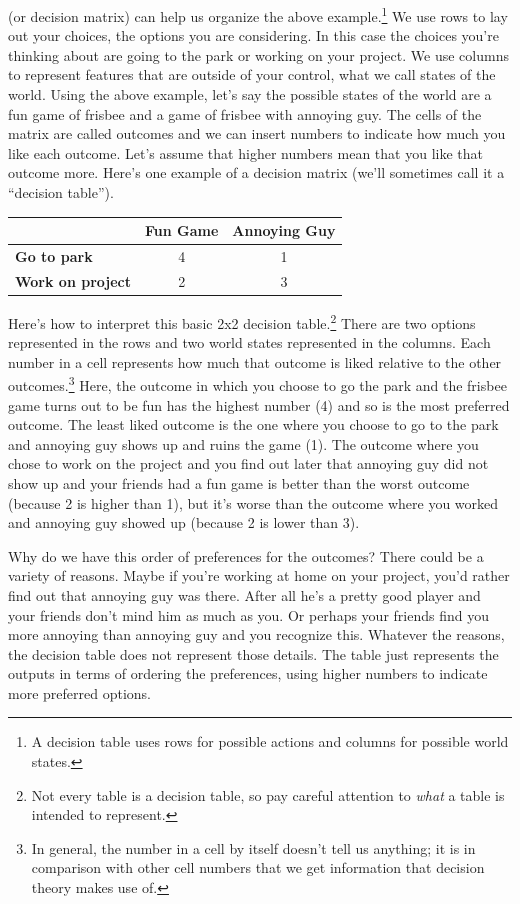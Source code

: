 \documentclass[]{tufte-book}
\begin{document}
 (or decision matrix) can help us organize the above example.\footnote{A decision table uses rows for possible actions and columns for possible world states.} We use rows to lay out your choices, the options you are considering. In this case the choices you're thinking about are going to the park or working on your project. We use columns to represent features that are outside of your control, what we call states of the world. Using the above example, let's say the possible states of the world are a fun game of frisbee and a game of frisbee with annoying guy. The cells of the matrix are called outcomes and we can insert numbers to indicate how much you like each outcome. Let's assume that higher numbers mean that you like that outcome more. Here's one example of a decision matrix (we'll sometimes call it a ``decision table'').

\begin{longtable}[]{@{}lcc@{}}
\toprule
& Fun Game & Annoying Guy\tabularnewline
\midrule
\endhead
\textbf{Go to park} & 4 & 1\tabularnewline
\textbf{Work on project} & 2 & 3\tabularnewline
\bottomrule
\end{longtable}

Here's how to interpret this basic 2x2 decision table.\footnote{Not every table is a decision table, so pay careful attention to \emph{what} a table is intended to represent.} There are two options represented in the rows and two world states represented in the columns. Each number in a cell represents how much that outcome is liked relative to the other outcomes.\footnote{In general, the number in a cell by itself doesn't tell us anything; it is in comparison with other cell numbers that we get information that decision theory makes use of.} Here, the outcome in which you choose to go the park and the frisbee game turns out to be fun has the highest number (4) and so is the most preferred outcome. The least liked outcome is the one where you choose to go to the park and annoying guy shows up and ruins the game (1). The outcome where you chose to work on the project and you find out later that annoying guy did not show up and your friends had a fun game is better than the worst outcome (because 2 is higher than 1), but it's worse than the outcome where you worked and annoying guy showed up (because 2 is lower than 3).

Why do we have this order of preferences for the outcomes? There could be a variety of reasons. Maybe if you're working at home on your project, you'd rather find out that annoying guy was there. After all he's a pretty good player and your friends don't mind him as much as you. Or perhaps your friends find you more annoying than annoying guy and you recognize this. Whatever the reasons, the decision table does not represent those details. The table just represents the outputs in terms of ordering the preferences, using higher numbers to indicate more preferred options.
\end{document}
